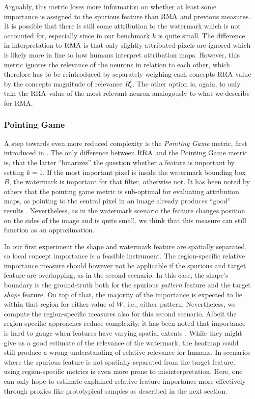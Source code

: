 Arguably, this metric loses more information on whether at least some importance is assigned to the spurious feature than $\operatorname*{RMA}$ and previous measures. It is possible that there is still some attribution to the watermark which is not accounted for, especially since in our benchmark $k$ is quite small. The difference in interpretation to $\operatorname*{RMA}$ is that only slightly attributed pixels are ignored which is likely more in line to how humans interpret attribution maps. 
However, this metric ignores the relevance of the neurons in relation to each other, which therefore has to be reintroduced by separately weighing each concepts $\operatorname*{RRA}$ value by the concepts magnitude of relevance $R_c^{\ell}$. The other option is, again, to only take the $\operatorname*{RRA}$ value of the most relevant neuron analogously to what we describe for RMA. 

\subsubsection{Pointing Game}
A step towards even more reduced complexity is the \textit{Pointing Game} metric, first introduced in \citep{Zhang2016}. The only difference between $\operatorname*{RRA}$ and the Pointing Game metric is, that the latter ``binarizes'' the question whether a feature is important by setting $k = 1$. If the most important pixel is inside the watermark bounding box $B$, the watermark is important for that filter, otherwise not.
It has been noted by others that the pointing game metric is sub-optimal for evaluating attribution maps, as pointing to the central pixel in an image already produces ``good'' results \citep{Gu2019}. Nevertheless, as in the watermark scenario the feature changes position on the sides of the image and is quite small, we think that this measure can still function as an approximation.

In our first experiment the shape and watermark feature are spatially separated, so local concept importance is a feasible instrument. The region-specific relative importance measure should however not be applicable if the spurious and target feature are overlapping, as in the second scenario. In this case, the shape's boundary is the ground-truth both for the spurious \textit{pattern} feature and the target \textit{shape} feature. On top of that, the majority of the importance is expected to lie within that region for either value of $W$, i.e., either pattern. 
Nevertheless, we compute the region-specific measures also for this second scenario. 
Albeit the region-specific approaches reduce complexity, it has been noted that importance is hard to gauge when features have varying spatial extents \citep{Achtibat2022}. 
While they might give us a good estimate of the relevance of the watermark, the heatmap could still produce a wrong understanding of relative relevance for humans. 
In scenarios where the spurious feature is not spatially separated from the target feature, using region-specific metrics is even more prone to misinterpretation. Here, one can only hope to estimate explained relative feature importance more effectively through proxies like prototypical samples as described in the next section.

